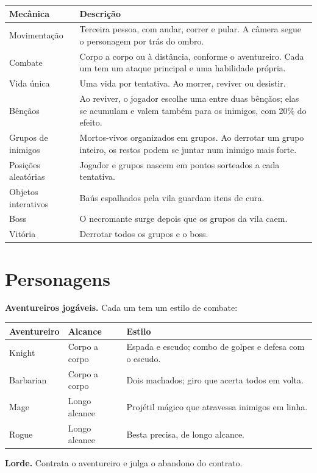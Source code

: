 \documentclass[11pt,a4paper]{article}
\begin{document}
\begin{tabularx}{\textwidth}{@{}lX@{}}
\toprule
\textbf{Mecânica} & \textbf{Descrição} \\
\midrule
Movimentação & Terceira pessoa, com andar, correr e pular. A câmera segue o personagem por trás do ombro. \\
Combate & Corpo a corpo ou à distância, conforme o aventureiro. Cada um tem um ataque principal e uma habilidade própria. \\
Vida única & Uma vida por tentativa. Ao morrer, reviver ou desistir. \\
Bênçãos & Ao reviver, o jogador escolhe uma entre duas bênçãos; elas se acumulam e valem também para os inimigos, com 20\% do efeito. \\
Grupos de inimigos & Mortos-vivos organizados em grupos. Ao derrotar um grupo inteiro, os restos podem se juntar num inimigo mais forte. \\
Posições aleatórias & Jogador e grupos nascem em pontos sorteados a cada tentativa. \\
Objetos interativos & Baús espalhados pela vila guardam itens de cura. \\
Boss & O necromante surge depois que os grupos da vila caem. \\
Vitória & Derrotar todos os grupos e o boss. \\
\bottomrule
\end{tabularx}

\section{Personagens}

\textbf{Aventureiros jogáveis.} Cada um tem um estilo de combate:

\begin{tabularx}{\textwidth}{@{}llX@{}}
\toprule
\textbf{Aventureiro} & \textbf{Alcance} & \textbf{Estilo} \\
\midrule
Knight & Corpo a corpo & Espada e escudo; combo de golpes e defesa com o escudo. \\
Barbarian & Corpo a corpo & Dois machados; giro que acerta todos em volta. \\
Mage & Longo alcance & Projétil mágico que atravessa inimigos em linha. \\
Rogue & Longo alcance & Besta precisa, de longo alcance. \\
\bottomrule
\end{tabularx}

\textbf{Lorde.} Contrata o aventureiro e julga o abandono do contrato.
\end{document}
